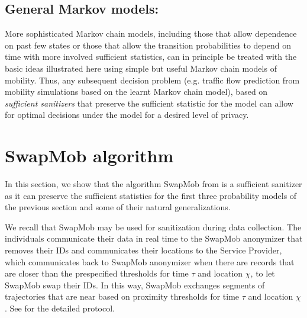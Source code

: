 \documentclass[times,twocolumn,final,authoryear]{elsarticle}
\begin{document}
\subsection{General Markov models:}
More sophisticated Markov chain models, including those that allow dependence on past few states or those that allow the transition probabilities to depend on time with more involved sufficient statistics, can in principle be treated with the basic ideas illustrated here using simple but useful Markov chain models of mobility. 
Thus, any subsequent decision problem (e.g. traffic flow prediction from mobility simulations based on the learnt Markov chain model), based on {\em sufficient sanitizers} that preserve the sufficient statistic for the model can allow for optimal decisions under the model for a desired level of privacy. 


\section{SwapMob algorithm}\label{Sec:swapmob}

In this section, we show that the algorithm SwapMob from \cite{Salas:2018-c} is a sufficient sanitizer as it can preserve the sufficient statistics for the first three probability models of the previous section and some of their natural generalizations.

We recall that SwapMob may be used for sanitization during data collection.
The individuals communicate their data in real time to the SwapMob anonymizer that removes their IDs and communicates their locations to the Service Provider, which communicates back to SwapMob anonymizer when there are records that are closer than the prespecified thresholds for time $\tau$ and location $\chi$, to let SwapMob swap their IDs.
In this way, SwapMob exchanges segments of trajectories that are near based on proximity thresholds for time $\tau$ and location $\chi$. See \cite{Salas:2018-c} for the detailed protocol.
%


%
\end{document}
